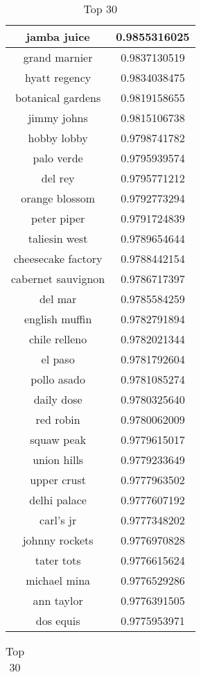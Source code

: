 \documentclass{article}
\begin{document}
\begin{table}[ht]
\parbox{.18\linewidth}{
\centering
\begin{tabular}{|c|c|}
\hline
jamba juice & 0.9855316025\\
\hline
grand marnier & 0.9837130519\\
\hline
hyatt regency & 0.9834038475\\
\hline
botanical gardens & 0.9819158655\\
\hline
jimmy johns & 0.9815106738\\
\hline
hobby lobby & 0.9798741782\\
\hline
palo verde & 0.9795939574\\
\hline
del rey & 0.9795771212\\
\hline
orange blossom & 0.9792773294\\
\hline
peter piper & 0.9791724839\\
\hline
taliesin west & 0.9789654644\\
\hline
cheesecake factory & 0.9788442154\\
\hline
cabernet sauvignon & 0.9786717397\\
\hline
del mar & 0.9785584259\\
\hline
english muffin & 0.9782791894\\
\hline
chile relleno & 0.9782021344\\
\hline
el paso & 0.9781792604\\
\hline
pollo asado & 0.9781085274\\
\hline
daily dose & 0.9780325640\\
\hline
red robin & 0.9780062009\\
\hline
squaw peak & 0.9779615017\\
\hline
union hills & 0.9779233649\\
\hline
upper crust & 0.9777963502\\
\hline
delhi palace & 0.9777607192\\
\hline
carl's jr & 0.9777348202\\
\hline
johnny rockets & 0.9776970828\\
\hline
tater tots & 0.9776615624\\
\hline
michael mina & 0.9776529286\\
\hline
ann taylor & 0.9776391505\\
\hline
dos equis & 0.9775953971\\
\hline
\end{tabular}
\caption{Top 30}
}
\hfill
\parbox{.24\linewidth}{
\centering
\begin{tabular}{|c|c|}

\end{tabular}}
\end{table}
\end{document}
